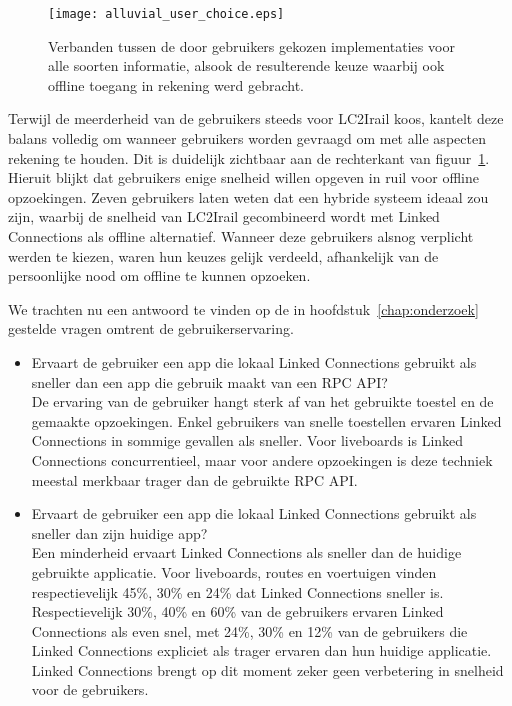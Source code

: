 \begin{figure}[ht]
	\centering
	\texttt{[image: alluvial\_user\_choice.eps]}
	\caption[Door gebruikers gekozen implementatie]{Verbanden tussen de door gebruikers gekozen implementaties voor alle soorten informatie, alsook de resulterende keuze waarbij ook offline toegang in rekening werd gebracht. }
	\label{fig:alluvialUserChoices}
\end{figure}

Terwijl de meerderheid van de gebruikers steeds voor LC2Irail koos, kantelt deze balans volledig om wanneer gebruikers worden gevraagd om met alle aspecten rekening te houden. Dit is duidelijk zichtbaar aan de rechterkant van figuur~\ref{fig:alluvialUserChoices}. Hieruit blijkt dat gebruikers enige snelheid willen opgeven in ruil voor offline opzoekingen. Zeven gebruikers laten weten dat een hybride systeem ideaal zou zijn, waarbij de snelheid van LC2Irail gecombineerd wordt met Linked Connections als offline alternatief. Wanneer deze gebruikers alsnog verplicht werden te kiezen, waren hun keuzes gelijk verdeeld, afhankelijk van de persoonlijke nood om offline te kunnen opzoeken. 

We trachten nu een antwoord te vinden op de in hoofdstuk~\ref{chap:onderzoek} gestelde vragen omtrent de gebruikerservaring.
\begin{itemize}
	\item Ervaart de gebruiker een app die lokaal Linked Connections gebruikt als sneller dan een app die gebruik maakt van een RPC API?\\
	De ervaring van de gebruiker hangt sterk af van het gebruikte toestel en de gemaakte opzoekingen. Enkel gebruikers van snelle toestellen ervaren Linked Connections in sommige gevallen als sneller. Voor liveboards is Linked Connections concurrentieel, maar voor andere opzoekingen is deze techniek meestal merkbaar trager dan de gebruikte RPC API.
	\item Ervaart de gebruiker een app die lokaal Linked Connections gebruikt als sneller dan zijn huidige app?\\
	Een minderheid ervaart Linked Connections als sneller dan de huidige gebruikte applicatie. Voor liveboards, routes en voertuigen vinden respectievelijk 45\%, 30\% en 24\% dat Linked Connections sneller is. Respectievelijk 30\%, 40\% en 60\% van de gebruikers ervaren Linked Connections als even snel, met 24\%, 30\% en 12\% van de gebruikers die Linked Connections expliciet als trager ervaren dan hun huidige applicatie. Linked Connections brengt op dit moment zeker geen verbetering in snelheid voor de gebruikers.
\end{itemize}


